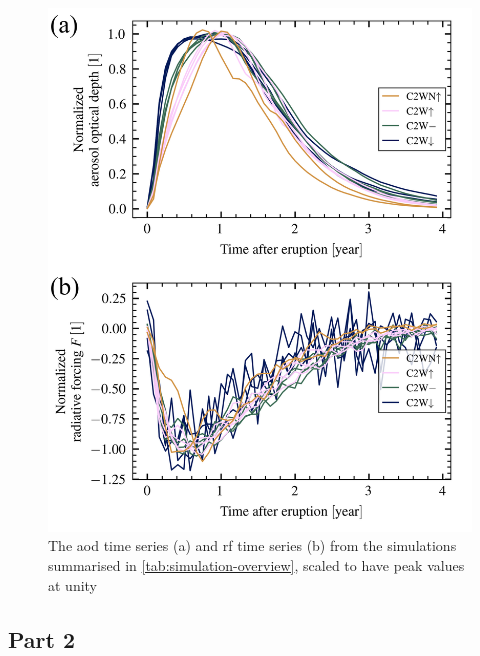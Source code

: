 \documentclass{ametsocV6.1}
\begin{document}
\begin{figure}
  \centering
  \includegraphics[width=0.95\linewidth]{figures/arrays_combined_normalized.png}

  \caption{The \gls{aod} time series (a) and \gls{rf} time series (b) from the simulations
    summarised in \ref{tab:simulation-overview}, scaled to have peak values at unity
  }\label{fig:arrays_normalised}
\end{figure}

\subsection{Part 2}
\end{document}
